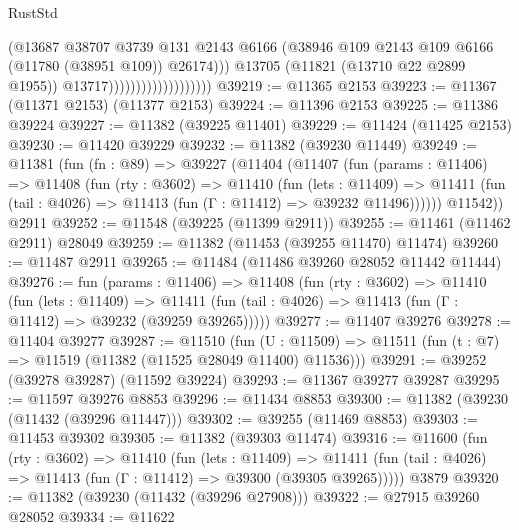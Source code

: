 \begin{lexlean}{RustStd}
\begin{coremodule}
                                            (@13687
                                              @38707
                                              @3739
                                              @131
                                              @2143
                                              @6166
                                              (@38946
                                                @109
                                                @2143
                                                @109
                                                @6166
                                                (@11780 (@38951 @109))
                                                @26174)))
                                          @13705
                                          (@11821 (@13710 @22 @2899 @1955))
                                          @13717)))))))))))))))))))
@39219 := @11365 @2153
@39223 := @11367 (@11371 @2153) (@11377 @2153)
@39224 := @11396 @2153
@39225 := @11386 @39224
@39227 := @11382 (@39225 @11401)
@39229 := @11424 (@11425 @2153)
@39230 := @11420 @39229
@39232 := @11382 (@39230 @11449)
@39249 := @11381
    (fun (fn : @89) =>
    @39227
      (@11404
        (@11407
          (fun (params : @11406) =>
          @11408
            (fun (rty : @3602) =>
            @11410
              (fun (lets : @11409) =>
              @11411 (fun (tail : @4026) => @11413 (fun (Γ : @11412) => @39232 @11496))))))
        @11542))
    @2911
@39252 := @11548 (@39225 (@11399 @2911))
@39255 := @11461 (@11462 @2911) @28049
@39259 := @11382 (@11453 (@39255 @11470) @11474)
@39260 := @11487 @2911
@39265 := @11484 (@11486 @39260 @28052 @11442 @11444)
@39276 := fun (params : @11406) =>
  @11408
    (fun (rty : @3602) =>
    @11410
      (fun (lets : @11409) =>
      @11411 (fun (tail : @4026) => @11413 (fun (Γ : @11412) => @39232 (@39259 @39265)))))
@39277 := @11407 @39276
@39278 := @11404 @39277
@39287 := @11510
    (fun (U : @11509) => @11511 (fun (t : @7) => @11519 (@11382 (@11525 @28049 @11400) @11536)))
@39291 := @39252 (@39278 @39287) (@11592 @39224)
@39293 := @11367 @39277 @39287
@39295 := @11597 @39276 @8853
@39296 := @11434 @8853
@39300 := @11382 (@39230 (@11432 (@39296 @11447)))
@39302 := @39255 (@11469 @8853)
@39303 := @11453 @39302
@39305 := @11382 (@39303 @11474)
@39316 := @11600
    (fun (rty : @3602) =>
    @11410
      (fun (lets : @11409) =>
      @11411 (fun (tail : @4026) => @11413 (fun (Γ : @11412) => @39300 (@39305 @39265)))))
    @3879
@39320 := @11382 (@39230 (@11432 (@39296 @27908)))
@39322 := @27915 @39260 @28052
@39334 := @11622

\end{coremodule}
\end{lexlean}

